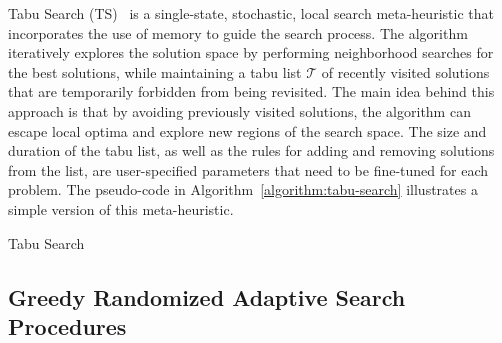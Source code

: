 Tabu Search (TS)~\cite{glover1999tabu,gendreau2010tabua,luke2013essentialsa,
  blummetaheuristics} is a single-state, stochastic, local search meta-heuristic
that incorporates the use of memory to guide the search process. The algorithm
iteratively explores the solution space by performing neighborhood searches for
the best solutions, while maintaining a tabu list $\mathcal{T}$ of recently
visited solutions that are temporarily forbidden from being revisited. The main
idea behind this approach is that by avoiding previously visited solutions, the
algorithm can escape local optima and explore new regions of the search space.
The size and duration of the tabu list, as well as the rules for adding and
removing solutions from the list, are user-specified parameters that need to be
fine-tuned for each problem. The pseudo-code in
Algorithm~\ref{algorithm:tabu-search} illustrates a simple version of this
meta-heuristic.

\begin{algorithm}[htb!]
  \DontPrintSemicolon
  \caption{Tabu Search}
  \label{algorithm:tabu-search}
\end{algorithm}

\subsection{Greedy Randomized Adaptive Search Procedures}


